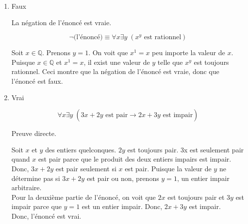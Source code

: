 \documentclass[12pt]{book}
\begin{document}
\newcommand{\reporttitle}{Devoir 1}
\newcommand{\reportauthorOne}{Kien Do}
\newcommand{\cidOne}{300163370}






\begin{enumerate}
    \item Faux
    
    La négation de l'énoncé est vraie.
    
    $$\neg \text{(l'énoncé)} \equiv \forall x \exists y \; (x^{y} \text{ est rationnel})$$
    
    Soit $x \in \mathbb{Q}$. Prenons $y = 1$. On voit que
    $x^1 = x$ peu importe la valeur de $x$. Puisque $x \in \mathbb{Q}$ et $x^1 = x$, il exist une valeur de $y$ telle que $x^y$ est toujours rationnel. Ceci montre que la négation de l'énoncé est vraie, donc que l'énoncé est faux.
    
    \item Vrai
    
    $$\forall x \exists y \; (3x + 2y \text{ est pair} \xrightarrow[]{} 2x + 3y \text{ est impair})$$
    
    Preuve directe.
    
    Soit $x$ et $y$ des entiers quelconques. $2y$ est toujours pair. 3x est seulement pair quand $x$ est pair parce que le produit des deux entiers impairs est impair. Donc, $3x + 2y$ est pair seulement si $x$ est pair. Puisque la valeur de $y$ ne détermine pas si $3x + 2y$ est pair ou non, prenons $y=1$, un entier impair arbitraire.\\
    
    Pour la deuxième partie de l'énoncé, on voit que $2x$ est toujours pair et $3y$ est impair parce que $y=1$ est un entier impair. Donc, $2x+3y$ est impair.\\
    
    Donc, l'énoncé est vrai.


\end{enumerate}
\end{document}

